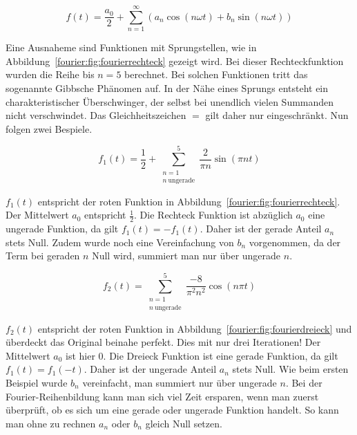 \begin{equation}
f(t) = \frac{a_0}{2} + \sum_{n=1}^{\infty} \left( a_n \cos\left( n\omega t \right) + b_n \sin\left( n \omega t \right) \right)
\end{equation}


Eine Ausnaheme sind Funktionen mit Sprungstellen, wie in Abbildung~\ref{fourier:fig:fourierrechteck} gezeigt wird.
Bei dieser Rechteckfunktion wurden die Reihe bis $n = 5$ berechnet.
Bei solchen Funktionen tritt das sogenannte Gibbsche Phänomen auf.
In der Nähe eines Sprungs entsteht ein charakteristischer Überschwinger, der selbst bei unendlich vielen Summanden nicht verschwindet.
Das Gleichheitszeichen $=$ gilt daher nur eingeschränkt. 
Nun folgen zwei Bespiele.



\begin{equation}
	f_1(t) = \frac{1}{2} + \sum_{\substack{n=1 \\ n\ \text{ungerade}}}^{5} \frac{2}{\pi n} \sin\left( \pi n t \right)
\end{equation}

$f_1(t)$ entspricht der roten Funktion in Abbildung~\ref{fourier:fig:fourierrechteck}. 
Der Mittelwert $a_0$ entspricht $\frac{1}{2}$. 
Die Rechteck Funktion ist abzüglich $a_0$ eine ungerade Funktion, da gilt $f_1(t) = -f_1(t)$. 
Daher ist der gerade Anteil $a_n$ stets Null. 
Zudem wurde noch eine Vereinfachung von $b_n$ vorgenommen, da der Term bei geraden $n$ Null wird, summiert man nur über ungerade $n$. 





\begin{equation}
	f_2(t) = \sum_{\substack{n=1 \\ n\ \text{ungerade}}}^{5} \frac{-8}{\pi^2 n^2} \cos(n\pi t)
\end{equation}

$f_2(t)$ entspricht der roten Funktion in Abbildung~\ref{fourier:fig:fourierdreieck} und überdeckt das Original beinahe perfekt. 
Dies mit nur drei Iterationen!
Der Mittelwert $a_0$ ist hier 0. 
Die Dreieck Funktion ist eine gerade Funktion, da gilt $f_1(t) = f_1(-t)$. 
Daher ist der ungerade Anteil $a_n$ stets Null. 
Wie beim ersten Beispiel wurde $b_n$ vereinfacht, man summiert nur über ungerade $n$. 
Bei der Fourier-Reihenbildung kann man sich viel Zeit ersparen, wenn man zuerst überprüft, ob es sich um eine gerade oder ungerade Funktion handelt.
So kann man ohne zu rechnen $a_n$ oder $b_n$ gleich Null setzen.




